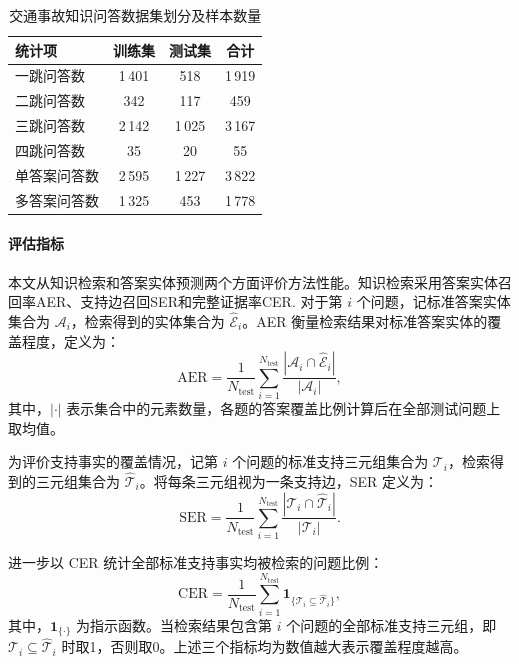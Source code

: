 \begin{table}[htbp]
  \centering
  \caption{交通事故知识问答数据集划分及样本数量}
  \label{tab:ch2-data}
  \fontsize{10.5bp}{13.65bp}\selectfont
  \begin{tabular*}{\linewidth}{@{\extracolsep{\fill}}lccc@{}}
    \toprule
    统计项 & 训练集 & 测试集 & 合计 \\
    \midrule
    一跳问答数 & 1\,401 & 518 & 1\,919 \\
    二跳问答数 & 342 & 117 & 459 \\
    三跳问答数 & 2\,142 & 1\,025 & 3\,167 \\
    四跳问答数 & 35 & 20 & 55 \\
    \midrule
    单答案问答数 & 2\,595 & 1\,227 & 3\,822 \\
    多答案问答数 & 1\,325 & 453 & 1\,778 \\
    \bottomrule
  \end{tabular*}
\end{table}

\paragraph{评估指标}

本文从知识检索和答案实体预测两个方面评价方法性能。知识检索采用答案实体召回率AER、支持边召回SER和完整证据率CER. 对于第 $i$ 个问题，记标准答案实体集合为 $\mathcal{A}_i$，检索得到的实体集合为 $\widehat{\mathcal{E}}_i$。AER 衡量检索结果对标准答案实体的覆盖程度，定义为：
\begin{equation}
\mathrm{AER}
=\frac{1}{N_{\mathrm{test}}}\sum_{i=1}^{N_{\mathrm{test}}}
\frac{|\mathcal{A}_i\cap\widehat{\mathcal{E}}_i|}{|\mathcal{A}_i|},
\label{eq:ch2-answer-entity-recall}
\end{equation}
其中，$|\cdot|$ 表示集合中的元素数量，各题的答案覆盖比例计算后在全部测试问题上取均值。

为评价支持事实的覆盖情况，记第 $i$ 个问题的标准支持三元组集合为 $\mathcal{T}_i$，检索得到的三元组集合为 $\widehat{\mathcal{T}}_i$。将每条三元组视为一条支持边，SER 定义为：
\begin{equation}
\mathrm{SER}
=\frac{1}{N_{\mathrm{test}}}\sum_{i=1}^{N_{\mathrm{test}}}
\frac{|\mathcal{T}_i\cap\widehat{\mathcal{T}}_i|}{|\mathcal{T}_i|}.
\label{eq:ch2-support-triple-recall}
\end{equation}

进一步以 CER 统计全部标准支持事实均被检索的问题比例：
\begin{equation}
\mathrm{CER}
=\frac{1}{N_{\mathrm{test}}}\sum_{i=1}^{N_{\mathrm{test}}}
\mathbf{1}_{\{\mathcal{T}_i\subseteq\widehat{\mathcal{T}}_i\}},
\label{eq:ch2-complete-evidence-rate}
\end{equation}
其中，$\mathbf{1}_{\{\cdot\}}$ 为指示函数。当检索结果包含第 $i$ 个问题的全部标准支持三元组，即 $\mathcal{T}_i\subseteq\widehat{\mathcal{T}}_i$ 时取1，否则取0。上述三个指标均为数值越大表示覆盖程度越高。

